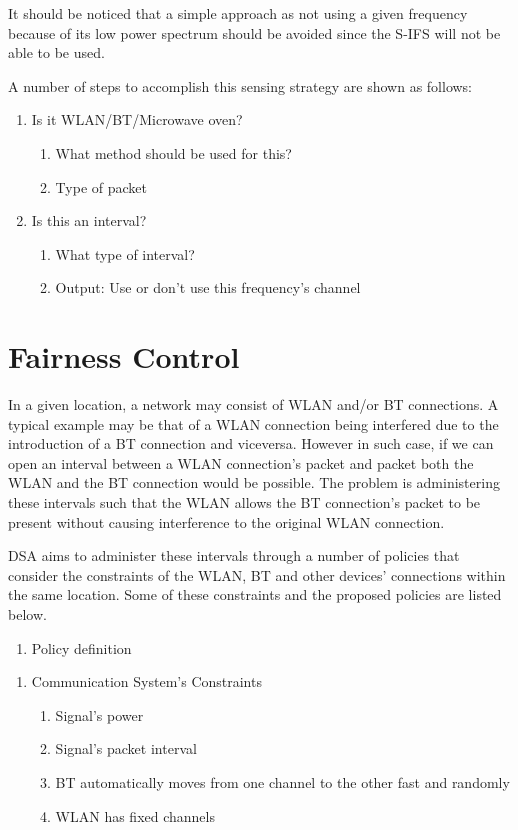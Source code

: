 \documentclass[conference]{ieeeconf}
\begin{document}
It should be noticed that a simple approach as not using a given frequency because of its low power spectrum should be avoided since the S-IFS will not be able to be used.

A number of steps to accomplish this sensing strategy are shown as follows:

\begin{enumerate}
  \item Is it WLAN/BT/Microwave oven? 
  \begin{enumerate}
    \item What method should be used for this? 
    \item Type of packet 
  \end{enumerate}
  \item Is this an interval? 
  \begin{enumerate}
    \item What type of interval? 
    \item Output: Use or don't use this frequency's channel
  \end{enumerate}
\end{enumerate}

\section{Fairness Control}
\label{sec:fairness}
In a given location, a network may consist of WLAN and/or BT connections.
A typical example may be that of a WLAN connection being interfered due to the introduction of a BT connection and viceversa.
However in such case, if we can open an interval between a WLAN connection's packet and packet both the WLAN and the BT connection would be possible.
The problem is administering these intervals such that the WLAN allows the BT connection's packet to be present without causing interference to the original WLAN connection.

DSA aims to administer these intervals through a number of policies that consider the constraints of the WLAN, BT and other devices' connections within the same location.
Some of these constraints and the proposed policies are listed below.

\begin{enumerate}
  \item Policy definition 
\end{enumerate}

\begin{enumerate}
  \item Communication System's Constraints 
  \begin{enumerate}
    \item Signal's power 
    \item Signal's packet interval 
    \item BT automatically moves from one channel to the other fast and randomly
    \item WLAN has fixed channels 
  \end{enumerate}
\end{enumerate}
\end{document}
